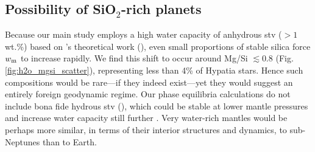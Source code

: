 









\subsection{Possibility of SiO$_2$-rich planets}\label{sec:discussion-sio2-water}

Because our main study employs a high water capacity of anhydrous stv ($>1$ wt.\%) based on \citeauthor{panero_hydrogen_2004}'s theoretical work (\citeyear{panero_hydrogen_2004}), even small proportions of stable silica force $w_{\rm m}$ to increase rapidly. We find this shift to occur around Mg/Si $\lesssim 0.8$ (Fig. \ref{fig:h2o_mgsi_scatter}), representing less than 4\% of Hypatia stars. Hence such compositions would be rare---if they indeed exist---yet they would suggest an entirely foreign geodynamic regime. Our phase equilibria calculations do not include bona fide hydrous stv (), which could be stable at lower mantle pressures and increase water capacity still further \citep[see][]{nisr_large_2020}. Very water-rich mantles would be perhaps more similar, in terms of their interior structures and dynamics, to sub-Neptunes than to Earth.


